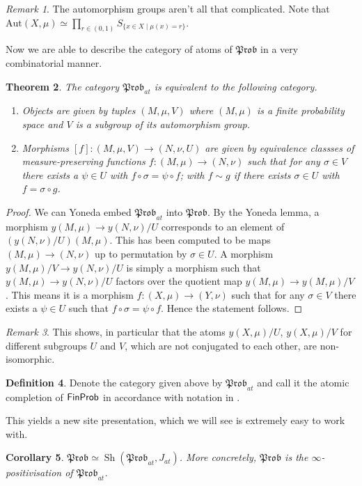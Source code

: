 \documentclass[a4paper]{amsproc}
\theoremstyle{plain}
\newtheorem{theorem}{Theorem}[section]
\newtheorem{corollary}[theorem]{Corollary}
\theoremstyle{definition}
\newtheorem{definition}[theorem]{Definition}
\theoremstyle{remark}
\newtheorem{remark}[theorem]{Remark}
\numberwithin{equation}{section}
\DeclareMathOperator{\Sh}{Sh}
\newcommand{\y}{\textit{y}}
\newcommand{\FinProb}{\textup{\textsf{FinProb}}}
\newcommand{\Prob}{\mathfrak{Prob}}
\begin{document}
\begin{remark} The automorphism groups aren't all that complicated. Note that $\text{Aut}(X,\mu)\simeq \prod_{r\in (0,1)} S_{\{x\in X\mid \mu(x)=r \}}$.
\end{remark}

Now we are able to describe the category of atoms of $\Prob$ in a very combinatorial manner.

\begin{theorem} The category $\Prob_{at}$ is equivalent to the following category. \begin{enumerate}
\item Objects are given by tuples $(M,\mu, V)$ where $(M,\mu)$ is a finite probability space and $V$ is a subgroup of its automorphism group.
\item Morphisms $[f]:(M,\mu, V)\rightarrow (N,\nu, U)$ are given by equivalence classses of measure-preserving functions $f:(M,\mu)\rightarrow (N,\nu)$ such that for any $\sigma\in V$ there exists a $\psi\in U$ with $f\circ \sigma =\psi\circ f $; with $f\sim g$ if there exists $\sigma\in U$ with $f=\sigma\circ g$.
\end{enumerate}
\end{theorem}
\begin{proof}
We can Yoneda embed $\Prob_{at}$ into $\Prob$.  By the Yoneda lemma, a morphism $\y (M,\mu)\rightarrow \y (N,\nu)/U$ corresponds to an element of $(\y (N,\nu)/U)(M,\mu)$. This has been computed to be maps $(M,\mu)\rightarrow (N,\nu)$ up to permutation by $\sigma\in U$. A morphism $\y (M,\mu)/V \rightarrow \y (N,\nu)/U$ is simply a morphism such that $\y (M,\mu)\rightarrow \y (N,\nu)/U$ factors over the quotient map $\y (M,\mu)\rightarrow \y (M,\mu)/V$. This means it is a morphism $f:(X,\mu)\rightarrow (Y,\nu)$ such that for any $\sigma\in V$ there exists a $\psi\in U$ such that $f\circ \sigma =\psi\circ f $. Hence the statement follows.
\end{proof}

\begin{remark} This shows, in particular that the atoms $\y (X,\mu)/U$, $\y (X,\mu)/V$ for different subgroups $U$ and $V$, which are not conjugated to each other, are non-isomorphic. %
\end{remark}

\begin{definition} Denote the category given above by $\Prob_{at}$ and call it the atomic completion of $\FinProb$ in accordance with notation in \cite{caramello_lafforgue}.
\end{definition}
This yields a new site presentation, which we will see is extremely easy to work with.
\begin{corollary} \label{coprod_representation}
    $\Prob\simeq \Sh(\Prob_{at},J_{at})$. More concretely, $\Prob$ is the $\infty$-positivisation of $\Prob_{at}$. %
\end{corollary}
\end{document}
